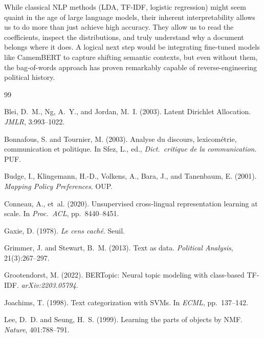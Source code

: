 \documentclass{article}
\begin{document}
While classical NLP methods (LDA, TF-IDF, logistic regression) might seem quaint in the age of large language models, their inherent interpretability allows us to do more than just achieve high accuracy. They allow us to read the coefficients, inspect the distributions, and truly understand why a document belongs where it does. A logical next step would be integrating fine-tuned models like CamemBERT to capture shifting semantic contexts, but even without them, the bag-of-words approach has proven remarkably capable of reverse-engineering political history.

\medskip

{
\small
\clearpage

\begin{thebibliography}{99}

Blei, D.~M., Ng, A.~Y., and Jordan, M.~I. (2003).
Latent {D}irichlet {A}llocation.
\textit{JMLR}, 3:993--1022.

Bonnafous, S. and Tournier, M. (2003).
Analyse du discours, lexicométrie, communication et politique.
In Sfez, L., ed., \textit{Dict.\ critique de la communication}. PUF.

Budge, I., Klingemann, H.-D., Volkens, A., Bara, J., and Tanenbaum, E. (2001).
\textit{Mapping Policy Preferences}. OUP.

Conneau, A., et~al. (2020).
Unsupervised cross-lingual representation learning at scale.
In \textit{Proc.\ ACL}, pp.~8440--8451.

Gaxie, D. (1978).
\textit{Le cens caché}. Seuil.

Grimmer, J. and Stewart, B.~M. (2013).
Text as data.
\textit{Political Analysis}, 21(3):267--297.

Grootendorst, M. (2022).
{BERTopic}: Neural topic modeling with class-based {TF-IDF}.
\textit{arXiv:2203.05794}.

Joachims, T. (1998).
Text categorization with SVMs.
In \textit{ECML}, pp.~137--142.

Lee, D.~D. and Seung, H.~S. (1999).
Learning the parts of objects by NMF.
\textit{Nature}, 401:788--791.


\end{thebibliography}}
\end{document}
